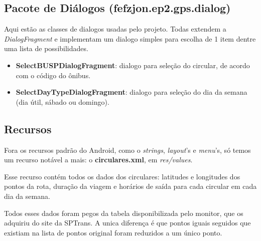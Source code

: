 \subsection{Pacote de Diálogos (fefzjon.ep2.gps.dialog)}
Aqui estão as classes de dialogos usadas pelo projeto. Todas extendem a \textit{DialogFragment} e implementam
um dialogo simples para escolha de 1 item dentre uma lista de possibilidades.
\begin{itemize}
    \item \textbf{SelectBUSPDialogFragment}: dialogo para seleção do circular, de acordo com o código do ônibus.
    \item \textbf{SelectDayTypeDialogFragment}: dialogo para seleção do dia da semana (dia útil, sábado ou domingo).
\end{itemize}

\subsection{Recursos}
Fora os recursos padrão do Android, como o \textit{strings}, \textit{layout}'s e \textit{menu}'s,
só temos um recurso notável a mais: o \textbf{circulares.xml}, em \textit{res/values}.

Esse recurso contém todos os dados dos circulares: latitudes e longitudes dos pontos da rota,
duração da viagem e horários de saída para cada circular em cada dia da semana.

Todos esses dados foram pegos da tabela disponibilizada pelo monitor, que os adquiriu do site
da SPTrans. A unica diferença é que pontos iguais seguidos que existiam na lista de pontos
original foram reduzidos a um único ponto.



